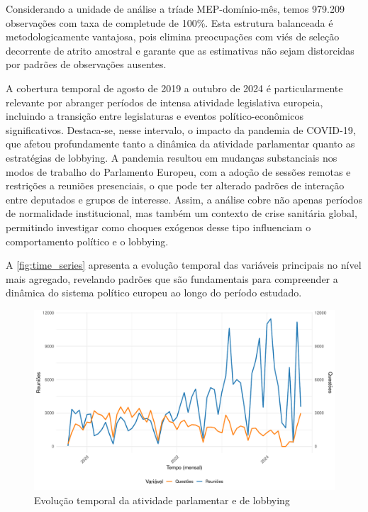 Considerando a unidade de análise a tríade MEP-domínio-mês, temos 979.209 observações com taxa de completude de 100\%. Esta estrutura balanceada é metodologicamente vantajosa, pois elimina preocupações com viés de seleção decorrente de atrito amostral e garante que as estimativas não sejam distorcidas por padrões de observações ausentes.

A cobertura temporal de agosto de 2019 a outubro de 2024 é particularmente relevante por abranger períodos de intensa atividade legislativa europeia, incluindo a transição entre legislaturas e eventos político-econômicos significativos. Destaca-se, nesse intervalo, o impacto da pandemia de COVID-19, que afetou profundamente tanto a dinâmica da atividade parlamentar quanto as estratégias de lobbying. A pandemia resultou em mudanças substanciais nos modos de trabalho do Parlamento Europeu, com a adoção de sessões remotas e restrições a reuniões presenciais, o que pode ter alterado padrões de interação entre deputados e grupos de interesse. Assim, a análise cobre não apenas períodos de normalidade institucional, mas também um contexto de crise sanitária global, permitindo investigar como choques exógenos desse tipo influenciam o comportamento político e o lobbying.

A \autoref{fig:time_series} apresenta a evolução temporal das variáveis principais no nível mais agregado, revelando padrões que são fundamentais para compreender a dinâmica do sistema político europeu ao longo do período estudado.

\begin{figure}[htbp]
\centering
\includegraphics[width=\textwidth]{figures/descriptive_plots/fig1_time_series_meetings_questions.pdf}
\caption{Evolução temporal da atividade parlamentar e de lobbying}
\label{fig:time_series}
\end{figure}

